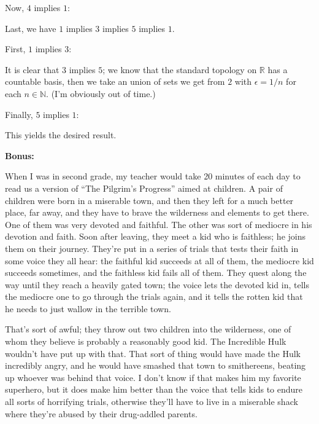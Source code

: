 \documentclass[a4paper,12pt]{article}
\newcommand{\tab}{\hspace{4mm}} %
\newcommand{\shunt}{\vspace{20mm}}
\newcommand{\ep}{\epsilon}
\newcommand{\N}{\mathbb{N}}
\newcommand{\R}{\mathbb{R}}
\begin{document}
\tab Now, $4$ implies $1$: 

Last, we have $1$ implies $3$ implies $5$ implies $1$.

\tab First, $1$ implies $3$:

\tab It is clear that $3$ implies $5$; we know that the standard topology on $\R$ has a countable basis, then we take an union of sets we get from $2$ with $\ep = 1/n$ for each $n \in \N$. (I'm obviously out of time.)

\tab Finally, $5$ implies $1$: 

This yields the desired result.


\shunt

{\bf Bonus:}

When I was in second grade, my teacher would take 20 minutes of each day to read us a version of ``The Pilgrim's Progress'' aimed at children. A pair of children were born in a miserable town, and then they left for a much better place, far away, and they have to brave the wilderness and elements to get there. One of them was very devoted and faithful. The other was sort of mediocre in his devotion and faith. Soon after leaving, they meet a kid who is faithless; he joins them on their journey. They're put in a series of trials that tests their faith in some voice they all hear: the faithful kid succeeds at all of them, the mediocre kid succeeds sometimes, and the faithless kid fails all of them. They quest along the way until they reach a heavily gated town; the voice lets the devoted kid in, tells the mediocre one to go through the trials again, and it tells the rotten kid that he needs to just wallow in the terrible town.

That's sort of awful; they throw out two children into the wilderness, one of whom they believe is probably a reasonably good kid. The Incredible Hulk wouldn't have put up with that. That sort of thing would have made the Hulk incredibly angry, and he would have smashed that town to smithereens, beating up whoever was behind that voice. I don't know if that makes him my favorite superhero, but it does make him better than the voice that tells kids to endure all sorts of horrifying trials, otherwise they'll have to live in a miserable shack where they're abused by their drug-addled parents.
\shunt
\end{document}

